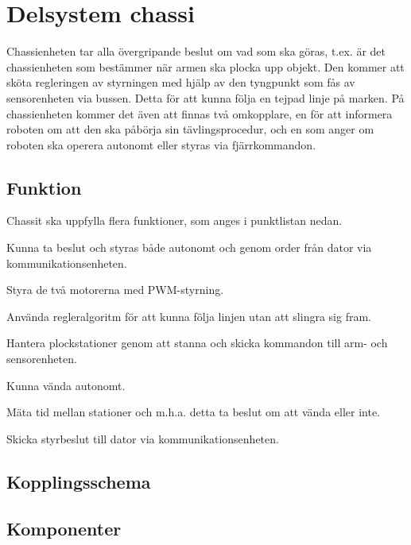
\section{Delsystem chassi}

Chassienheten tar alla övergripande beslut om vad som ska göras, t.ex. är det chassienheten som bestämmer när armen ska plocka upp objekt. Den kommer att sköta regleringen av styrningen med hjälp av den tyngpunkt som fås av sensorenheten via bussen. Detta för att kunna följa en tejpad linje på marken. På chassienheten kommer det även att finnas två omkopplare, en för att informera roboten om att den ska påbörja sin tävlingsprocedur, och en som anger om roboten ska operera autonomt eller styras via fjärrkommandon.


\subsection{Funktion}

Chassit ska uppfylla flera funktioner, som anges i punktlistan nedan.
\begin{packed_itemize}
\item Kunna ta beslut och styras både autonomt och genom order från dator via kommunikationsenheten.
\item Styra de två motorerna med PWM-styrning.
\item Använda regleralgoritm för att kunna följa linjen utan att slingra sig fram.
\item Hantera plockstationer genom att stanna och skicka kommandon till arm- och sensorenheten.
\item Kunna vända autonomt.
\item Mäta tid mellan stationer och m.h.a. detta ta beslut om att vända eller inte.
\item Skicka styrbeslut till dator via kommunikationsenheten.
\end{packed_itemize}


\subsection{Kopplingsschema}



\subsection{Komponenter}

